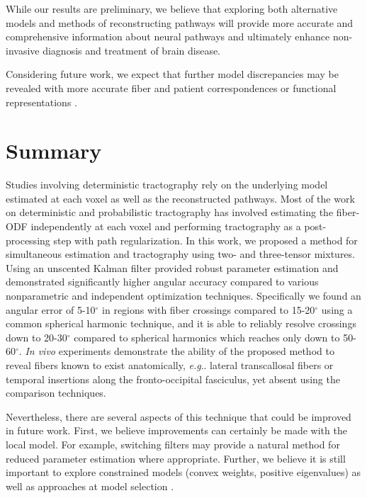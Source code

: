 \documentclass[final,hyperref]{gatech-thesis}
\makeatletter
\renewcommand{\deg}{\ensuremath{^\circ}\xspace}
\DeclareRobustCommand\onedot{\futurelet\@let@token\@onedot}
\def\@onedot{\ifx\@let@token.\else.\null\fi\xspace}
\newcommand{\eg}{\textit{e.g}\onedot}
\newcommand{\Invivo}{\textit{In vivo}\xspace}
\makeatother
\begin{document}
While our results are preliminary, we believe that exploring both alternative
models and methods of reconstructing pathways will provide more accurate and
comprehensive information about neural pathways and ultimately enhance
non-invasive diagnosis and treatment of brain disease.

Considering future work, we expect that further model discrepancies may be
revealed with more accurate fiber and patient correspondences
\cite{ODonnell2007,Maddah2008} or functional representations
\cite{Goodlett2008}.









\chapter{Summary}

Studies involving deterministic tractography rely on the underlying model
estimated at each voxel as well as the reconstructed pathways.
%
Most of the work on deterministic and probabilistic tractography has involved
estimating the fiber-ODF independently at each voxel and performing
tractography as a post-processing step with path regularization.
%
In this work, we proposed a method for simultaneous estimation and
tractography using two- and three-tensor mixtures.  Using an unscented Kalman
filter provided robust parameter estimation and demonstrated significantly
higher angular accuracy compared to various nonparametric and independent
optimization techniques.  Specifically we found an angular error of 5-10\deg
in regions with fiber crossings compared to 15-20\deg using a common spherical
harmonic technique, and it is able to reliably resolve crossings down to
20-30\deg compared to spherical harmonics which reaches only down to
50-60\deg.
%
\Invivo experiments demonstrate the ability of the proposed method to reveal
fibers known to exist anatomically, \eg lateral transcallosal fibers or
temporal insertions along the fronto-occipital fasciculus, yet absent using
the comparison techniques.

Nevertheless, there are several aspects of this technique that could be
improved in future work.
%
First, we believe improvements can certainly be made with the local model.
For example, switching filters may provide a natural method for reduced
parameter estimation where appropriate.  Further, we believe it is still
important to explore constrained models (convex weights, positive eigenvalues)
\cite{malcolm2009cukf} as well as approaches at model selection
\cite{Behrens2007}.
\end{document}
